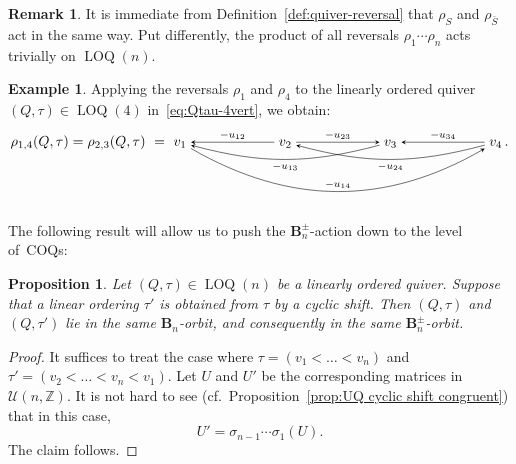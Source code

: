 \documentclass[11pt, letterpaper]{amsart}
\newtheorem{proposition}[theorem]{Proposition}
\theoremstyle{definition}
\newtheorem{remark}[theorem]{Remark}
\newtheorem{example}[theorem]{Example}
\numberwithin{equation}{section}
\def\ZZ{{\mathbb Z}}
\newcommand\LOQ{\operatorname{LOQ}}
\begin{document}
\begin{remark} %
\label{rem:full-reversal}
It is immediate from Definition~\ref{def:quiver-reversal} that $\rho_S$ and $\rho_{\bar S}$ act in the same way.
Put differently, the product of all reversals $\rho_{1} \cdots\rho_{n}$ acts trivially on $\LOQ(n)$. 
\end{remark}

\begin{example}
Applying the reversals $\rho_1$ and $\rho_4$ to the linearly ordered quiver $(Q,\tau)\in\LOQ(4)$ 
in~\eqref{eq:Qtau-4vert}, we obtain:
\vspace{2pt}
\begin{equation*}
\rho_{1,4}(Q,\tau) = \rho_{2,3}(Q,\tau)
\ =\  \begin{tikzcd}[arrows={-stealth}, sep=small, cramped, sep=60]
v_1  \ar[rrr,  bend right=30, "-u_{14}"] &    
v_2 \ar[l, swap, "-u_{12}"] \ar[r, "-u_{23}"]    &    
v_3  \ar[ll, bend left=15, "-u_{13}"] &    
v_4 \ar[ll, bend left=15, "-u_{24}"] \ar[l, swap, "-u_{34}"]
\end{tikzcd}\,.
\vspace{-6pt}
\end{equation*}
\end{example}

The following result will allow us to push the $\mathbf{B}_n^\pm$-action down to the level of~COQs: 

\begin{proposition}
\label{pr:B-orbit-of-COQ}
Let $(Q,\tau)\in\LOQ(n)$ be a linearly ordered quiver. %
Suppose that a linear ordering $\tau'$ is obtained from $\tau$ by a cyclic shift. 
Then %
$(Q,\tau)$ and $(Q,\tau')$ lie in the same $\mathbf{B}_n$-orbit, and consequently in the same $\mathbf{B}_n^\pm$-orbit.
\end{proposition}

\begin{proof}
It suffices to treat the case where $\tau=(v_1<\dots<v_n)$ and $\tau'=(v_2<\dots<v_n<v_1)$. 
Let $U$ and $U'$ be the corresponding matrices in~$\mathcal{U}(n,\ZZ)$. 
It is not hard to see (cf.\ Proposition~\ref{prop:UQ cyclic shift congruent}) 
that in this case, 
\begin{equation}
\label{eq:bondal-coxeter}
U'=\sigma_{n-1} \cdots  \sigma_1(U). 
\end{equation}
The claim follows. 
\end{proof}
\end{document}
